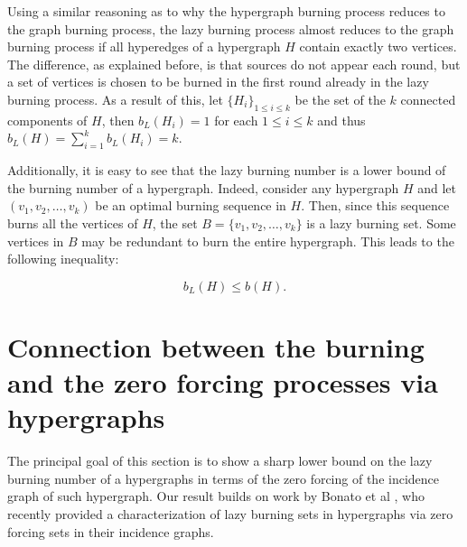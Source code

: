 \documentclass[12pt]{article}
\theoremstyle{plain}
\theoremstyle{definition}
\theoremstyle{remark}
\begin{document}
Using a similar reasoning as to why the hypergraph burning process reduces to the graph burning process, the lazy burning process almost reduces to the graph burning process if all hyperedges of a hypergraph $H$ contain exactly two vertices.
The difference, as explained before, is that sources do not appear each round, but a set of vertices is chosen to be burned in the first round already in the lazy burning process.
As a result of this, let $\{H_i\}_{1\leq i\leq k}$ be the set of the $k$ connected components of $H$, then $b_L(H_i)=1$ for each $1\leq i \leq k$ and thus $b_L(H)=\sum_{i=1}^k b_L(H_i)= k$. 


Additionally, it is easy to see that the lazy burning number is a lower bound of the burning number of a hypergraph. 
Indeed, consider any hypergraph $H$ and let $(v_1,v_2,\dots,v_k)$ be an optimal burning sequence in $H$. Then, since this sequence burns all the vertices of $H$, the set $B=\{v_1,v_2,\dots,v_k\}$ is a lazy burning set. Some vertices in $B$ may be redundant to burn the entire hypergraph. This leads to the following inequality:

\begin{equation}
	b_L(H) \leq b(H).
	\label{eq:burning number vs lazy burning number}
\end{equation}


 
\section{Connection between the burning and the zero forcing processes via hypergraphs}\label{sec:burning}


The principal goal of this section is to show a sharp lower bound on the lazy burning number of a hypergraphs in terms of the zero forcing of the incidence graph of such hypergraph. Our result builds on work by Bonato et al \cite{hypergraph}, who recently provided a characterization of lazy burning sets in hypergraphs via zero forcing sets in their incidence graphs.
 
\end{document}
